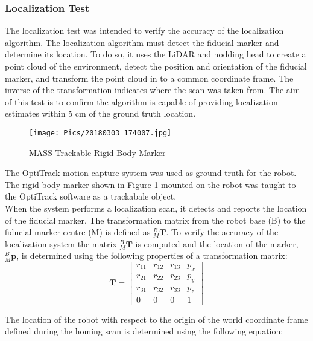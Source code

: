 \subsubsection{Localization Test}

The localization test was intended to verify the accuracy of the localization algorithm. The localization algorithm must detect the fiducial marker and determine its location. To do so, it uses the LiDAR and nodding head to create a point cloud of the environment, detect the position and orientation of the fiducial marker, and transform the point cloud in to a common coordinate frame. The inverse of the transformation indicates where the scan was taken from. The aim of this test is to confirm the algorithm is capable of providing localization estimates within 5 cm of the ground truth location.\\

\begin{figure}
    \centering
    \texttt{[image: Pics/20180303\_174007.jpg]}
    \caption{MASS Trackable Rigid Body Marker}
    \label{fig:rigidbody}
\end{figure}

The OptiTrack motion capture system was used as ground truth for the robot. The rigid body marker shown in Figure \ref{fig:rigidbody} mounted on the robot was taught to the OptiTrack software as a trackabale object.\\

When the system performs a localization scan, it detects and reports the location of the fiducial marker. The transformation matrix from the robot base (B) to the fiducial marker centre (M) is defined as $^B_M\mathbf{T}$. To verify the accuracy of the localization system the matrix $^B_{M}\mathbf{T}$ is computed and the location of the marker, $^B_{M}\mathbf{p}$, is determined using the following properties of a transformation matrix:\\

\begin{equation*}
\mathbf{T} = \begin{bmatrix}
    r_{11} & r_{12} & r_{13} & p_{x} \\
    r_{21} & r_{22} & r_{23} & p_{y} \\
    r_{31} & r_{32} & r_{33} & p_{z} \\
    0 & 0 & 0 & 1
\end{bmatrix}
\end{equation*}

The location of the robot with respect to the origin of the world coordinate frame defined during the homing scan is determined using the following equation:

